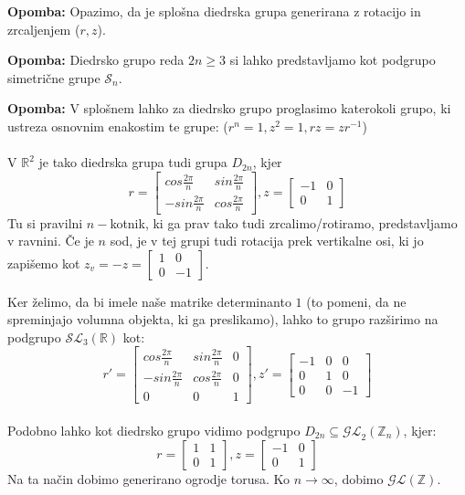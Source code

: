 \documentclass[a4paper]{article}
\newcounter{environment:definition_counter}
\newcounter{environment:theorem_counter}
\newcounter{environment:statement_counter}
\newenvironment{remark}
{\textbf{Opomba:}}
{}
\begin{document}
\begin{remark}
Opazimo, da je splošna diedrska grupa generirana z rotacijo in zrcaljenjem ($r, z$).
\end{remark}

\begin{remark}
Diedrsko grupo reda $2n \geq 3$ si lahko predstavljamo kot podgrupo simetrične grupe $\mathcal{S}_n$.
\end{remark}

\begin{remark}
V splošnem lahko za diedrsko grupo proglasimo katerokoli grupo, ki ustreza osnovnim enakostim te grupe: ($r^n = 1, z^2 = 1, rz = zr^{-1}$)
\end{remark}
\\
\\
V $\mathbb{R}^2$ je tako diedrska grupa tudi grupa $D_{2n}$, kjer 
$$r = \begin{bmatrix}
		cos\frac{2\pi}{n} & sin\frac{2\pi}{n} \\
		-sin\frac{2\pi}{n} & cos\frac{2\pi}{n}
	  \end{bmatrix}, z = \begin{bmatrix}
		-1 & 0 \\
		0 & 1
	  \end{bmatrix}$$
Tu si pravilni $n-$kotnik, ki ga prav tako tudi zrcalimo/rotiramo, predstavljamo v ravnini. Če je $n$ sod, je v tej grupi tudi rotacija prek vertikalne osi, ki jo zapišemo kot $z_v = -z = \begin{bmatrix}
		1 & 0 \\
		0 & -1
	  \end{bmatrix}$.
	  
Ker želimo, da bi imele naše matrike determinanto $1$ (to pomeni, da ne spreminjajo volumna objekta, ki ga preslikamo), lahko to grupo razširimo na podgrupo $\mathcal{SL}_3(\mathbb{R})$ kot:
$$r' = \begin{bmatrix}
		cos\frac{2\pi}{n} & sin\frac{2\pi}{n} & 0\\
		-sin\frac{2\pi}{n} & cos\frac{2\pi}{n} & 0\\
		0 & 0 & 1
	  \end{bmatrix}, 
	  z' = \begin{bmatrix}
		-1 & 0 & 0\\
		0 & 1 & 0\\
		0 & 0 & -1
	  \end{bmatrix}$$	  
\\	 
Podobno lahko kot diedrsko grupo vidimo podgrupo $D_{2n} \subseteq \mathcal{GL}_2(\mathbb{Z}_n)$, kjer:
	 $$r = \begin{bmatrix}
		1 & 1 \\
		0 & 1
	  \end{bmatrix}, z = \begin{bmatrix}
		-1 & 0 \\
		0 & 1
	  \end{bmatrix}$$
Na ta način dobimo generirano ogrodje torusa. Ko $n \to \infty$, dobimo $\mathcal{GL}(\mathbb{Z})$.
	  
\end{document}

